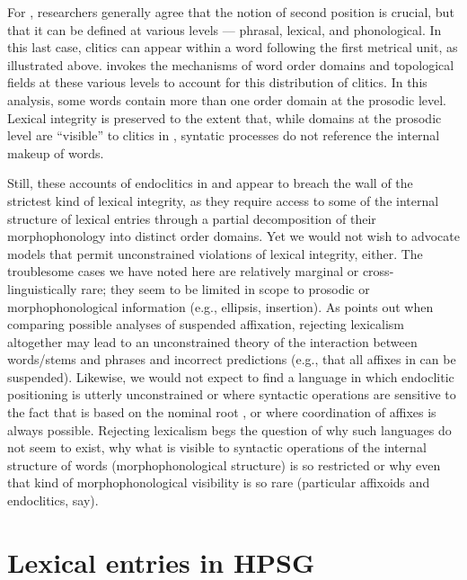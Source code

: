 \documentclass[output=paper
	        ,collection
	        ,collectionchapter
 	        ,biblatex
                ,babelshorthands
                ,newtxmath
                ,draftmode
                ,colorlinks, citecolor=brown
]{langscibook}
\begin{document}
For , researchers generally agree that the notion of second position is crucial, but that it
can be defined at various levels --- phrasal, lexical, and phonological. In this last case, clitics
can appear within a word following the first metrical unit, as illustrated above.
\citet{Dost2007} invokes the mechanisms of word order domains \citep{Reape1994} and topological fields \citep{Kathol2000a} at these various levels to account for this distribution of clitics. In this analysis, some words contain more than one order domain at the prosodic level. Lexical integrity is preserved to the extent that, while domains at the prosodic level are ``visible'' to clitics in , syntatic processes do not reference the internal makeup of words.

Still, these accounts of endoclitics in  and  appear to breach the wall of the strictest kind of lexical integrity, as they require access to some of the internal structure of lexical entries through a partial decomposition of their morphophonology into distinct order domains. Yet we would not wish to advocate models that permit unconstrained violations of lexical integrity, either. The troublesome cases we have noted here are relatively marginal or cross-linguistically rare; they seem to be limited in scope to prosodic or morphophonological information (e.g., ellipsis, insertion). As \citet{Broadwell2008} points out when comparing possible analyses of  suspended affixation, rejecting lexicalism altogether may lead to an unconstrained theory of the interaction between words/stems and phrases and incorrect predictions (e.g., that all affixes in  can be suspended). Likewise, we would not expect to find a language in which endoclitic positioning is utterly unconstrained or where syntactic operations are sensitive to the fact that  is based on the nominal root , or where coordination of affixes is always possible. Rejecting lexicalism begs the question of why such languages do not seem to exist, why what is visible to syntactic operations of the internal structure of words (morphophonological structure) is so restricted or why even that kind of morphophonological visibility is so rare (particular affixoids and endoclitics, say).


\section{Lexical entries in HPSG}
\end{document}
